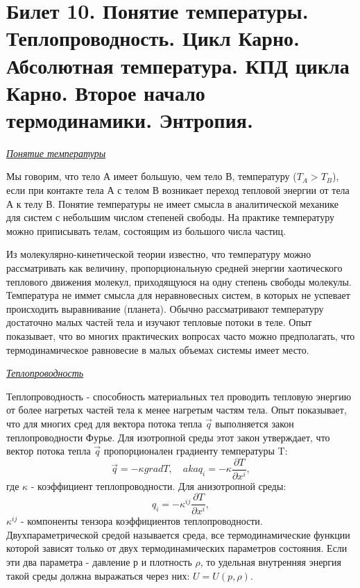 \newpage
\section{Билет 10. Понятие температуры. Теплопроводность. Цикл Карно. Абсолютная температура. КПД цикла Карно. Второе начало термодинамики. Энтропия.}



\begin{center}
	\textit{\underline{Понятие температуры}}
\end{center}

Мы говорим, что тело А имеет большую, чем тело В, температуру ($T_A > T_B$), если при контакте тела А с телом В возникает переход тепловой энергии от тела А к телу В. Понятие температуры не имеет смысла в аналитической механике для систем с небольшим числом степеней свободы. На практике температуру можно приписывать телам, состоящим из большого числа частиц. 

Из молекулярно-кинетической теории известно, что температуру можно рассматривать как величину, пропорциональную средней энергии хаотического теплового движения молекул, приходящуюся на одну степень свободы молекулы.  Температура не иммет смысла для неравновесных систем, в которых не успевает происходить выравнивание (планета).  Обычно рассматривают температуру достаточно малых частей тела и изучают тепловые потоки в теле. Опыт показывает, что во многих практических вопросах часто можно предполагать, что термодинамическое равновесие в малых объемах системы имеет место.  


\begin{center}
	\textit{\underline{Теплопроводность}}
\end{center}

Теплопроводность - способность материальных тел проводить тепловую энергию от более нагретых частей тела к менее нагретым частям тела. Опыт показывает, что для многих сред для вектора потока тепла $\vec{q}$ выполняется закон теплопроводности Фурье. Для изотропной среды этот закон утверждает, что вектор потока тепла $\vec{q}$ пропорционален градиенту температуры T: $$\vec{q} = -\kappa grad T, \quad aka q_i = -\kappa \frac{\partial T}{\partial x^i},$$ где $\kappa$ - коэффициент теплопроводности. Для анизотропной среды: $$q_i = -\kappa^{ij} \frac{\partial T}{\partial x^i},$$ $\kappa^{ij}$ - компоненты тензора коэффициентов теплопроводности.
Двухпараметрической средой называется среда, все термодинамические функции которой зависят только от двух термодинамических параметров состояния. Если эти два параметра - давление р и плотность $\rho$, то удельная внутренняя энергия такой среды должна выражаться через них: $U = U (p, \rho)$.

